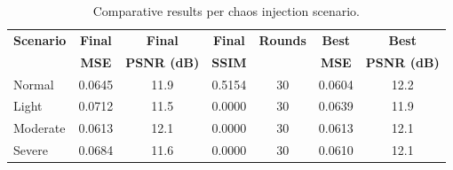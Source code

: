 \begin{table}[htbp]
\centering
\caption{Comparative results per chaos injection scenario.}
\label{tab:chaos_results}
\small
\begin{tabular}{lcccccc}
\hline
\textbf{Scenario} & \textbf{Final} & \textbf{Final} & \textbf{Final} & \textbf{Rounds} & \textbf{Best} & \textbf{Best} \\
 & \textbf{MSE} & \textbf{PSNR (dB)} & \textbf{SSIM} & & \textbf{MSE} & \textbf{PSNR (dB)} \\
\hline
Normal & 0.0645 & 11.9 & 0.5154 & 30 & 0.0604 & 12.2 \\
Light & 0.0712 & 11.5 & 0.0000 & 30 & 0.0639 & 11.9 \\
Moderate & 0.0613 & 12.1 & 0.0000 & 30 & 0.0613 & 12.1 \\
Severe & 0.0684 & 11.6 & 0.0000 & 30 & 0.0610 & 12.1 \\
\hline
\end{tabular}
\end{table}

